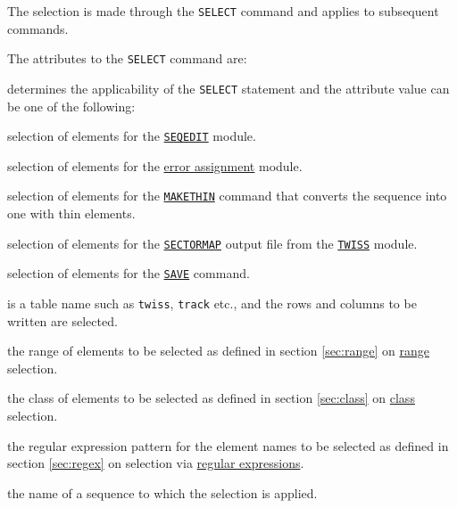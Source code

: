 The selection is made through the {\tt SELECT} command and applies to
subsequent commands.


The attributes to the {\tt SELECT} command are:
\begin{madlist}
   determines the applicability of the
         {\tt SELECT} statement and the attribute value can be one of
         the following:
     \begin{madlist}
        selection of elements for the
       \hyperref[sec:seqedit]{\tt SEQEDIT} module.
       
        selection of elements for the
       \hyperref[chap:error]{error assignment} module.
       
        selection of elements for the
       \hyperref[chap:makethin]{\tt MAKETHIN} command that
       converts the sequence into one with thin elements.
       
        selection of elements for the
       \hyperref[subsec:sectormap]{\tt SECTORMAP} output file
       from the \hyperref[chap:twiss]{\tt TWISS} module.
       
        selection of elements for the
       \hyperref[sec:save]{\tt SAVE} command.
       
        is a table name such as {\tt twiss}, 
       {\tt track} etc., and the rows and columns to be written are
       selected.
     \end{madlist} 
     
   the range of elements to be selected as defined in
  section \ref{sec:range} on \hyperref[sec:range]{range} selection.

   the class of elements to be selected as defined in
  section \ref{sec:class} on \hyperref[sec:class]{class} selection.

   the regular expression pattern for the element names
  to be selected as defined in section \ref{sec:regex} on selection via
  \hyperref[sec:regex]{regular expressions}. 

   the name of a sequence to which the selection is applied.


\end{madlist}
